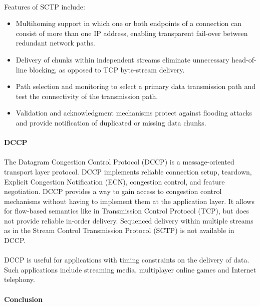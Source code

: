 \paragraph{}
Features of SCTP include:
\begin{itemize}
\item Multihoming support in which one or both endpoints of a connection can consist of more than one IP address, enabling transparent fail-over between redundant network paths.
\item Delivery of chunks within independent streams eliminate unnecessary head-of-line blocking, as opposed to TCP byte-stream delivery.
\item Path selection and monitoring to select a primary data transmission path and test the connectivity of the transmission path.
\item Validation and acknowledgment mechanisms protect against flooding attacks and provide notification of duplicated or missing data chunks.
\end{itemize}

\paragraph{} \textbf{DCCP}
\paragraph{}
The Datagram Congestion Control Protocol (DCCP) is a message-oriented transport layer protocol. DCCP implements reliable connection setup, teardown, Explicit Congestion Notification (ECN), congestion control, and feature negotiation. DCCP provides a way to gain access to congestion control mechanisms without having to implement them at the application layer. It allows for flow-based semantics like in Transmission Control Protocol (TCP), but does not provide reliable in-order delivery. Sequenced delivery within multiple streams as in the Stream Control Transmission Protocol (SCTP) is not available in DCCP.
\paragraph{}
DCCP is useful for applications with timing constraints on the delivery of data. Such applications include streaming media, multiplayer online games and Internet telephony.

\paragraph{} \textbf{Conclusion}
